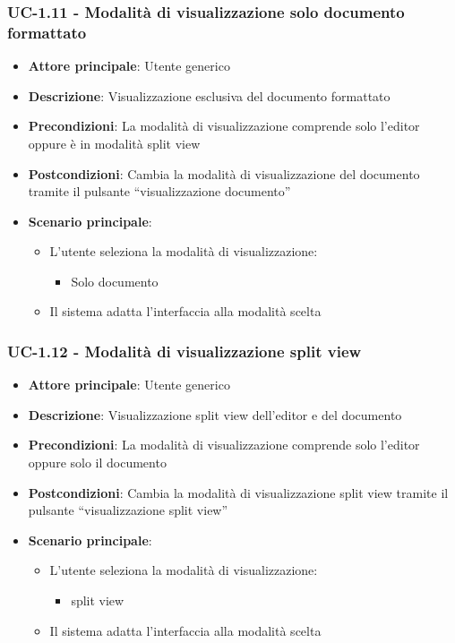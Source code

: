 \documentclass[11pt,a4paper]{article}
\begin{document}
\subsubsection{UC-1.11 - Modalità di visualizzazione solo documento formattato}
\begin{itemize}
    \item \textbf{Attore principale}: Utente generico
    \item \textbf{Descrizione}: Visualizzazione esclusiva del documento formattato
    \item \textbf{Precondizioni}: La modalità di visualizzazione comprende solo l’editor oppure è in modalità split view
    \item \textbf{Postcondizioni}: Cambia la modalità di visualizzazione del documento tramite il pulsante “visualizzazione documento”
    \item \textbf{Scenario principale}:
        \begin{itemize}
            \item L'utente seleziona la modalità di visualizzazione:
                    \begin{itemize}
                    \item Solo documento
                    \end{itemize}
            \item Il sistema adatta l'interfaccia alla modalità scelta
        \end{itemize}
\end{itemize}

\subsubsection{UC-1.12 - Modalità di visualizzazione split view}
\begin{itemize}
    \item \textbf{Attore principale}: Utente generico
    \item \textbf{Descrizione}: Visualizzazione split view dell’editor e del documento
    \item \textbf{Precondizioni}: La modalità di visualizzazione comprende solo l’editor oppure solo il documento

    \item \textbf{Postcondizioni}: Cambia la modalità di visualizzazione split view tramite il pulsante “visualizzazione split view”
    \item \textbf{Scenario principale}:
        \begin{itemize}
            \item L'utente seleziona la modalità di visualizzazione:
                    \begin{itemize}
                    \item split view
                    \end{itemize}
            \item Il sistema adatta l'interfaccia alla modalità scelta
        \end{itemize}
\end{itemize}
\end{document}
